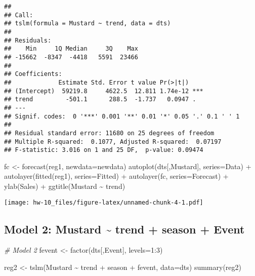 \documentclass[
]{article}
\newenvironment{Shaded}{\begin{snugshade}}{\end{snugshade}}
\newcommand{\AttributeTok}[1]{\textcolor[rgb]{0.77,0.63,0.00}{#1}}
\newcommand{\CommentTok}[1]{\textcolor[rgb]{0.56,0.35,0.01}{\textit{#1}}}
\newcommand{\DecValTok}[1]{\textcolor[rgb]{0.00,0.00,0.81}{#1}}
\newcommand{\FunctionTok}[1]{\textcolor[rgb]{0.00,0.00,0.00}{#1}}
\newcommand{\NormalTok}[1]{#1}
\newcommand{\OtherTok}[1]{\textcolor[rgb]{0.56,0.35,0.01}{#1}}
\newcommand{\SpecialCharTok}[1]{\textcolor[rgb]{0.00,0.00,0.00}{#1}}
\newcommand{\StringTok}[1]{\textcolor[rgb]{0.31,0.60,0.02}{#1}}
\begin{document}
\begin{verbatim}
## 
## Call:
## tslm(formula = Mustard ~ trend, data = dts)
## 
## Residuals:
##    Min     1Q Median     3Q    Max 
## -15662  -8347  -4418   5591  23466 
## 
## Coefficients:
##             Estimate Std. Error t value Pr(>|t|)    
## (Intercept)  59219.8     4622.5  12.811 1.74e-12 ***
## trend         -501.1      288.5  -1.737   0.0947 .  
## ---
## Signif. codes:  0 '***' 0.001 '**' 0.01 '*' 0.05 '.' 0.1 ' ' 1
## 
## Residual standard error: 11680 on 25 degrees of freedom
## Multiple R-squared:  0.1077, Adjusted R-squared:  0.07197 
## F-statistic: 3.016 on 1 and 25 DF,  p-value: 0.09474
\end{verbatim}

\begin{Shaded}
\begin{Highlighting}[]
\NormalTok{fc }\OtherTok{\textless{}{-}} \FunctionTok{forecast}\NormalTok{(reg1, }\AttributeTok{newdata=}\NormalTok{newdata)}
\FunctionTok{autoplot}\NormalTok{(dts[,}\StringTok{\textquotesingle{}Mustard\textquotesingle{}}\NormalTok{], }\AttributeTok{series=}\StringTok{\textquotesingle{}Data\textquotesingle{}}\NormalTok{) }\SpecialCharTok{+}
  \FunctionTok{autolayer}\NormalTok{(}\FunctionTok{fitted}\NormalTok{(reg1), }\AttributeTok{series=}\StringTok{\textquotesingle{}Fitted\textquotesingle{}}\NormalTok{) }\SpecialCharTok{+}
  \FunctionTok{autolayer}\NormalTok{(fc, }\AttributeTok{series=}\StringTok{\textquotesingle{}Forecast\textquotesingle{}}\NormalTok{) }\SpecialCharTok{+}
  \FunctionTok{ylab}\NormalTok{(}\StringTok{\textquotesingle{}Sales\textquotesingle{}}\NormalTok{) }\SpecialCharTok{+}
  \FunctionTok{ggtitle}\NormalTok{(}\StringTok{\textquotesingle{}Mustard \textasciitilde{} trend\textquotesingle{}}\NormalTok{)}
\end{Highlighting}
\end{Shaded}

\texttt{[image: hw-10\_files/figure-latex/unnamed-chunk-4-1.pdf]}

\hypertarget{model-2-mustard-trend-season-event}{%
\subsection{Model 2: Mustard \textasciitilde{} trend + season +
Event}\label{model-2-mustard-trend-season-event}}

\begin{Shaded}
\begin{Highlighting}[]
\CommentTok{\# Model 2}
\NormalTok{fevent }\OtherTok{\textless{}{-}} \FunctionTok{factor}\NormalTok{(dts[,}\StringTok{\textquotesingle{}Event\textquotesingle{}}\NormalTok{], }\AttributeTok{levels=}\DecValTok{1}\SpecialCharTok{:}\DecValTok{3}\NormalTok{)}

\NormalTok{reg2 }\OtherTok{\textless{}{-}} \FunctionTok{tslm}\NormalTok{(Mustard }\SpecialCharTok{\textasciitilde{}}\NormalTok{ trend }\SpecialCharTok{+}\NormalTok{ season }\SpecialCharTok{+}\NormalTok{ fevent, }\AttributeTok{data=}\NormalTok{dts)}
\FunctionTok{summary}\NormalTok{(reg2)}
\end{Highlighting}
\end{Shaded}
\end{document}
